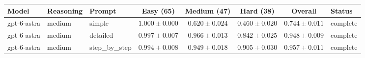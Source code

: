 \begin{tabular}{lllcccc l}
\hline
Model & Reasoning & Prompt & Easy (65) & Medium (47) & Hard (38) & Overall & Status \\
\hline
gpt-6-astra & medium & simple & $1.000\pm0.000$ & $0.620\pm0.024$ & $0.460\pm0.020$ & $0.744\pm0.011$ & complete \\
gpt-6-astra & medium & detailed & $0.997\pm0.007$ & $0.966\pm0.013$ & $0.842\pm0.025$ & $0.948\pm0.009$ & complete \\
gpt-6-astra & medium & step\_by\_step & $0.994\pm0.008$ & $0.949\pm0.018$ & $0.905\pm0.030$ & $0.957\pm0.011$ & complete \\
\hline
\end{tabular}
